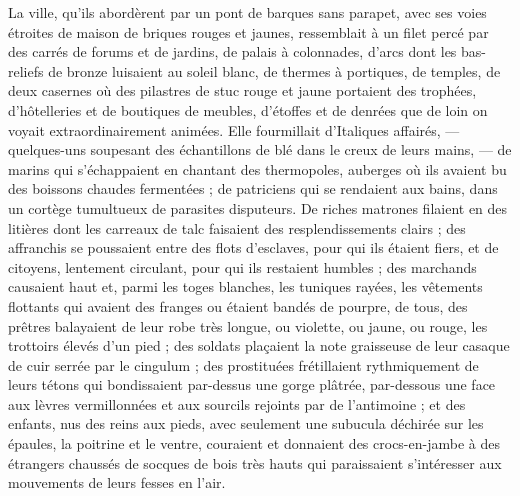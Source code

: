 \documentclass[a4paper, 11pt, oneside, polutonikogreek, french]{article}
\begin{document}
La ville, qu'ils abordèrent par un pont de barques sans parapet, avec ses voies étroites de maison de briques rouges et jaunes, ressemblait à un filet percé par des carrés de forums et de jardins, de palais à colonnades, d'arcs dont les bas-reliefs de bronze luisaient au soleil blanc, de thermes à portiques, de temples, de deux casernes où des pilastres de stuc rouge et jaune portaient des trophées, d'hôtelleries et de boutiques de meubles, d'étoffes et de denrées que de loin on voyait extraordinairement animées. Elle fourmillait d'Italiques affairés, --- quelques-uns soupesant des échantillons de blé dans le creux de leurs mains, --- de marins qui s'échappaient en chantant des thermopoles, auberges où ils avaient bu des boissons chaudes fermentées ; de patriciens qui se rendaient aux bains, dans un cortège tumultueux de parasites disputeurs. De riches matrones filaient en des litières dont les carreaux de talc faisaient des resplendissements clairs ; des affranchis se poussaient entre des flots d'esclaves, pour qui ils étaient fiers, et de citoyens, lentement circulant, pour qui ils restaient humbles ; des marchands causaient haut et, parmi les toges blanches, les tuniques rayées, les vêtements flottants qui avaient des franges ou étaient bandés de pourpre, de tous, des prêtres balayaient de leur robe très longue, ou violette, ou jaune, ou rouge, les trottoirs élevés d'un pied ; des soldats plaçaient la note graisseuse de leur casaque de cuir serrée par le cingulum ; des prostituées frétillaient rythmiquement de leurs tétons qui bondissaient par-dessus une gorge plâtrée, par-dessous une face aux lèvres vermillonnées et aux sourcils rejoints par de l'antimoine ; et des enfants, nus des reins aux pieds, avec seulement une subucula déchirée sur les épaules, la poitrine et le ventre, couraient et donnaient des crocs-en-jambe à des étrangers chaussés de socques de bois très hauts qui paraissaient s'intéresser aux mouvements de leurs fesses en l'air.
\end{document}
